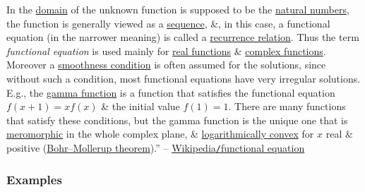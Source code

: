 \documentclass{article}
\numberwithin{equation}{section}
\begin{document}
In the \href{https://en.wikipedia.org/wiki/Domain_of_a_function}{domain} of the unknown function is supposed to be the \href{https://en.wikipedia.org/wiki/Natural_number}{natural numbers}, the function is generally viewed as a \href{https://en.wikipedia.org/wiki/Sequence_(mathematics)}{sequence}, \&, in this case, a functional equation (in the narrower meaning) is called a \href{https://en.wikipedia.org/wiki/Recurrence_relation}{recurrence relation}. Thus the term \textit{functional equation} is used mainly for \href{https://en.wikipedia.org/wiki/Real_function}{real functions} \& \href{https://en.wikipedia.org/wiki/Complex_function}{complex functions}. Moreover a \href{https://en.wikipedia.org/wiki/Smooth_function}{smoothness condition} is often assumed for the solutions, since without such a condition, most functional equations have very irregular solutions. E.g., the \href{https://en.wikipedia.org/wiki/Gamma_function}{gamma function} is a function that satisfies the functional equation $f(x + 1) = xf(x)$ \& the initial value $f(1) = 1$. There are many functions that satisfy these conditions, but the gamma function is the unique one that is \href{https://en.wikipedia.org/wiki/Meromorphic_function}{meromorphic} in the whole complex plane, \& \href{https://en.wikipedia.org/wiki/Logarithmically_convex_function}{logarithmically convex} for $x$ real \& positive (\href{https://en.wikipedia.org/wiki/Bohr%E2%80%93Mollerup_theorem}{Bohr--Mollerup theorem}).'' -- \href{https://en.wikipedia.org/wiki/Functional_equation}{Wikipedia\texttt{/}functional equation}

\subsubsection{Examples}
\end{document}
